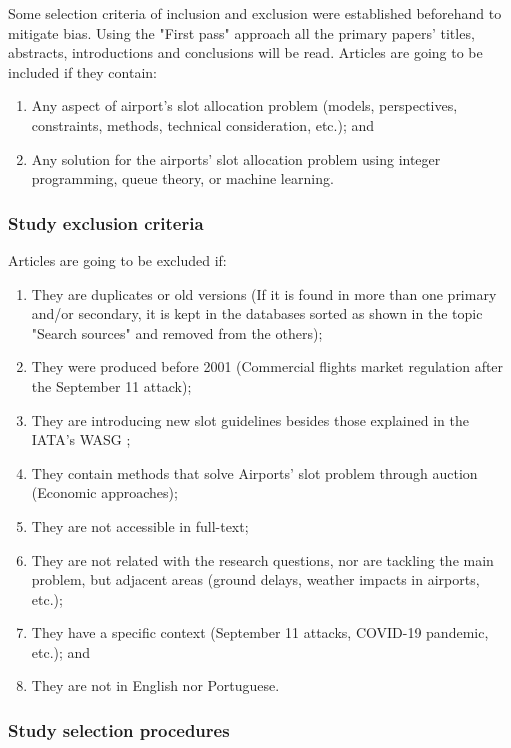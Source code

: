 Some selection criteria of inclusion and exclusion were established beforehand to mitigate bias. Using the "First pass" approach \cite{keshav2007read} all the primary papers' titles, abstracts, introductions and conclusions will be read. 
Articles are going to be included if they contain: 
\begin{enumerate}
    \item Any aspect of airport's slot allocation problem (models, perspectives, constraints, methods, technical consideration, etc.); and
    \item Any solution for the airports' slot allocation problem using integer programming, queue theory, or machine learning.
\end{enumerate}

\subsubsection{Study exclusion criteria}

Articles are going to be excluded if: 
\begin{enumerate}
    \item They are duplicates or old versions (If it is found in more than one primary and/or secondary, it is kept in the databases sorted as shown in the topic "Search sources" and removed from the others);
    \item They were produced before 2001 (Commercial flights market regulation after the September 11 attack);
    \item They are introducing new slot guidelines besides those explained in the IATA's WASG \cite{WASG2020};
    \item They contain methods that solve Airports' slot problem through auction (Economic approaches); 
    \item They are not accessible in full-text;
    \item They are not related with the research questions, nor are tackling the main problem, but adjacent areas (ground delays, weather impacts in airports, etc.);
    \item They have a specific context (September 11 attacks, COVID-19 pandemic, etc.); and
    \item They are not in English nor Portuguese.
\end{enumerate}

\subsubsection{Study selection procedures}


